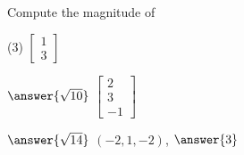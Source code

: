 \documentclass{ximera}
\begin{document}
\begin{exercise}%
    Compute the magnitude of
    \begin{tasks}(3)
        \task
        $\begin{bmatrix}
            1 \\
            3
        \end{bmatrix}$
        
        $\answer{\sqrt{10}}$
        \task
        $\begin{bmatrix}
            2 \\
            3 \\
            -1
        \end{bmatrix}$
        
        $\answer{\sqrt{14}}$
        \task $(-2,1,-2)$, $\answer{3}$
    \end{tasks}
\end{exercise}
\end{document}
